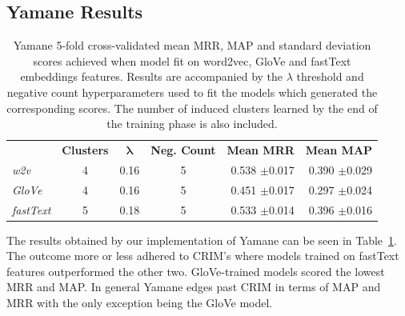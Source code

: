 \subsection{Yamane Results}
\begin{table}\centering
    \begin{tabular}{@{}lcccrr@{}} \toprule
    & \textbf{Clusters} & $\bm{\lambda}$ & \textbf{Neg. Count} & \textbf{Mean MRR} & \textbf{Mean MAP}\\
    \cmidrule{2-6}
    \textit{w2v} & 4 & 0.16 & 5 & 0.538 $\pm$0.017 & 0.390 $\pm$0.029\\
    \textit{GloVe} & 4 & 0.16 & 5 & 0.451 $\pm$0.017 & 0.297 $\pm$0.024\\
    \textit{fastText} & 5 & 0.18 & 5 & 0.533 $\pm$0.014 & 0.396 $\pm$0.016\\
    \bottomrule
    \end{tabular}
    \caption[Yamane hyperparameter settings and 5-fold cross-validated mean MRR, MAP scores]{Yamane 5-fold cross-validated mean MRR, MAP and standard deviation scores achieved when model fit on word2vec, GloVe and fastText embeddings features.  Results are accompanied by the $\lambda$ threshold and negative count hyperparameters used to fit the models which generated the corresponding scores. The number of induced clusters learned by the end of the training phase is also included.}
    \label{tab:yamane_settings_scores}
    
\end{table}
The results obtained by our implementation of Yamane can be seen in Table~\ref{tab:yamane_settings_scores}.  The outcome more or less adhered to CRIM's where models trained on fastText features outperformed the other two.  GloVe-trained models scored the lowest \ac{MRR} and \ac{MAP}.  In general Yamane edges past CRIM in terms of \ac{MAP} and \ac{MRR} with the only exception being the GloVe model.

